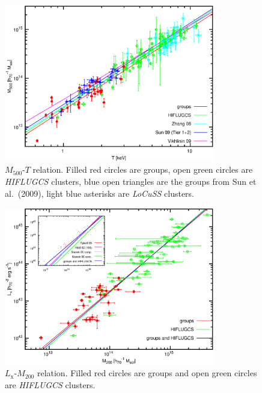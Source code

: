 \documentclass[structabstract]{aa}
\begin{document}
   \begin{figure}
   \centering
   \includegraphics[width=0.82\textwidth]{mthda500_c.eps}
   \caption{$M_{500}$-$T$ relation. Filled red circles are groups, open green circles
     are \emph{HIFLUGCS} clusters, blue open
     triangles are the groups from Sun et al.\ (2009), light blue asterisks are
     \emph{LoCuSS} clusters.}
              \label{fig:mtrelation}%
    \end{figure}
   \begin{figure}
   \centering
   \includegraphics[width=0.82\textwidth]{lmhdahifl_c.eps}
   \caption{$L_{\text{x}}$-$M_{200}$ relation. Filled red circles are groups and
     open green circles are \emph{HIFLUGCS} clusters.}
              \label{fig:lmrelation}%
    \end{figure}
\end{document}
